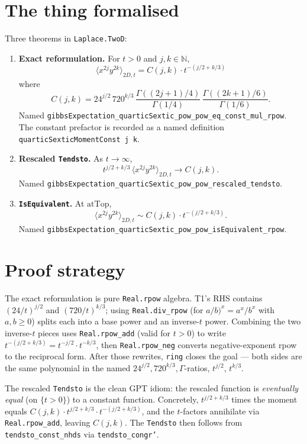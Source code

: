 \documentclass[11pt]{article}
\begin{document}
\section{The thing formalised}

Three theorems in \texttt{Laplace.TwoD}:

\begin{enumerate}[leftmargin=1.5em]
\item \textbf{Exact reformulation.}
  For $t > 0$ and $j, k \in \mathbb N$,
  $$
    \langle x^{2j} y^{2k}\rangle_{2D, t}
    = C(j, k) \cdot t^{-(j/2 + k/3)}
  $$
  where
  $$
    C(j, k) = 24^{j/2}\,720^{k/3}\,
    \frac{\Gamma((2j+1)/4)}{\Gamma(1/4)}\,
    \frac{\Gamma((2k+1)/6)}{\Gamma(1/6)}.
  $$
  Named \texttt{gibbsExpectation\_quarticSextic\_pow\_pow\_eq\_const\_mul\_rpow}.
  The constant prefactor is recorded as a named definition
  \texttt{quarticSexticMomentConst j k}.

\item \textbf{Rescaled \texttt{Tendsto}.} As $t \to \infty$,
  $$
    t^{j/2 + k/3}\,\langle x^{2j} y^{2k}\rangle_{2D, t}
    \to C(j, k).
  $$
  Named \texttt{gibbsExpectation\_quarticSextic\_pow\_pow\_rescaled\_tendsto}.

\item \textbf{\texttt{IsEquivalent}.} At $\mathrm{atTop}$,
  $$
    \langle x^{2j} y^{2k}\rangle_{2D, t}
    \sim C(j, k) \cdot t^{-(j/2 + k/3)}.
  $$
  Named \texttt{gibbsExpectation\_quarticSextic\_pow\_pow\_isEquivalent\_rpow}.
\end{enumerate}

\section{Proof strategy}

The exact reformulation is pure \texttt{Real.rpow} algebra. T1's
RHS contains $(24/t)^{j/2}$ and $(720/t)^{k/3}$; using
\texttt{Real.div\_rpow} (for $a/b)^x = a^x / b^x$ with $a, b \ge 0$)
splits each into a base power and an inverse-$t$ power. Combining
the two inverse-$t$ pieces uses \texttt{Real.rpow\_add} (valid for
$t > 0$) to write
$t^{-(j/2 + k/3)} = t^{-j/2} \cdot t^{-k/3}$, then
\texttt{Real.rpow\_neg} converts negative-exponent rpow to the
reciprocal form. After those rewrites, \texttt{ring} closes the
goal --- both sides are the same polynomial in the named
$24^{j/2}, 720^{k/3}, \Gamma$-ratios, $t^{j/2}$, $t^{k/3}$.

The rescaled \texttt{Tendsto} is the clean GPT idiom: the rescaled
function is \emph{eventually equal} (on $\{t > 0\}$) to a constant
function. Concretely, $t^{j/2 + k/3}$ times the moment equals
$C(j, k) \cdot t^{j/2 + k/3} \cdot t^{-(j/2 + k/3)}$, and the
$t$-factors annihilate via \texttt{Real.rpow\_add}, leaving
$C(j, k)$. The \texttt{Tendsto} then follows from
\texttt{tendsto\_const\_nhds} via \texttt{tendsto\_congr'}.
\end{document}
